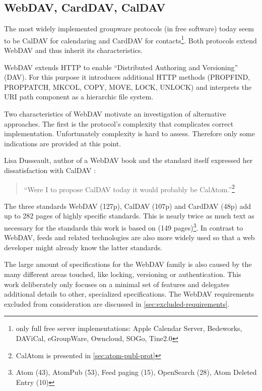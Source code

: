 \documentclass[11pt,a4paper,headsepline,twoside]{scrartcl}		%
\begin{document}
\subsection{WebDAV, CardDAV, CalDAV}
\label{sec:carddav-caldav}

The most widely implemented groupware protocols (in free software) today seem to
be CalDAV \cite{RFC4791} for calendaring and CardDAV \cite{RFC6352} for
contacts\footnote{only full free server implementations: Apple Calendar Server,
  Bedeworks, DAViCal, eGroupWare, Owncloud, SOGo, Tine2.0}. Both protocols
extend WebDAV \cite{RFC4918} and thus inherit its characteristics.

WebDAV extends HTTP to enable ``Distributed Authoring and Versioning''
(DAV). For this purpose it introduces additional HTTP methods (PROPFIND,
PROPPATCH, MKCOL, COPY, MOVE, LOCK, UNLOCK) and interprets the URI path
component as a hierarchic file system.

Two characteristics of WebDAV motivate an investigation of alternative
approaches. The first is the protocol's complexity that complicates correct
implementation. Unfortunately complexity is hard to assess. Therefore only some
indications are provided at this point.

Lisa Dusseault, author of a WebDAV book \cite{Dusseault2004} and the standard
itself expressed her dissatisfaction with CalDAV \cite{Dusseault2008}:

\begin{quote}
``Were I to propose CalDAV today it would probably be CalAtom.''\footnote{CalAtom is presented in \autoref{sec:atom-publ-prot}}
\end{quote}

The three standards WebDAV (127p), CalDAV (107p) and CardDAV (48p) add up to 282
pages of highly specific standards. This is nearly twice as much text as
necessary for the standards this work is based on (149 pages)\footnote{Atom
  (43), AtomPub (53), Feed paging (15), OpenSearch (28), Atom Deleted Entry
  (10)}. In contrast to WebDAV, feeds and related technologies are also more
widely used so that a web developer might already know the latter standards.

The large amount of specifications for the WebDAV family is also caused by the
many different areas touched, like locking, versioning or authentication. This
work deliberately only focuses on a minimal set of features and delegates
additional details to other, specialized specifications. The WebDAV requirements
excluded from consideration are discussed in \ref{sec:excluded-requirements}.
\end{document}
